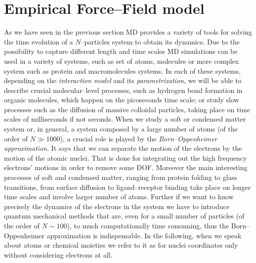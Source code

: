 \section{Empirical Force--Field model}
\label{sec:EmpiricalFF}
As we have seen in the previous section \ac{MD} provides a variety of tools for solving the time evolution of a $N$--particles system to obtain its dynamics. Due to the possibility to capture different length and time scales \ac{MD} simulations can be used in a variety of systems, such as set of atoms, molecules or more complex system such as protein and macromolecules systems. In each of these systems, depending on the \textit{interaction model} and its \textit{parametrization}, we will be able to describe crucial molecular--level processes, such as hydrogen bond formation in organic molecules, which happen on the picoseconds time scale; or study slow processes such as the diffusion of massive colloidal particles, taking place on time scales of milliseconds if not seconds.
When we study a soft or condensed matter system or, in general, a system composed by a large number of atoms (of the order of $N \gg 1000$), a crucial role is played by the \textit{Born--Oppenheimer approximation}. It says that we can separate the motion of the electrons by the motion of the atomic nuclei. That is done for integrating out the high frequency electrons' motions in order to remove some \ac{DOF}. Moreover the main interesting processes of soft and condensed matter, ranging from protein folding to glass transitions, from surface diffusion to ligand--receptor binding take place on longer time scales and involve larger number of atoms. Further if we want to know precisely the dynamics of the electrons in the system we have to introduce quantum mechanical methods that are, even for a small number of particles (of the order of $N\sim 100$), to much computationally time consuming, thus the Born--Oppenheimer approximation is indispensable. In the following, when we speak about atoms or chemical moieties we refer to it as for nuclei coordinates only without considering electrons at all.

